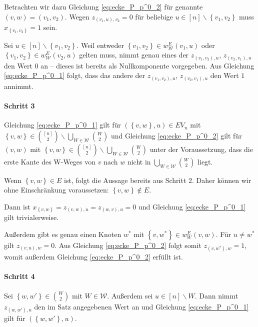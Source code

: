 \documentclass[10p,a4paper,BCOR = 12mm, DIV=15]{scrbook}
\begin{document}
\begin{bew}
Betrachten wir dazu Gleichung \eqref{eq:ecke_P_p^0_2} für genannte $\left(v, w\right) = \left(v_1, v_2\right)$. Wegen $z_{\left(v_1, u\right), v_2} = 0$ für beliebige $u \in \left[n\right] \backslash \left\{v_1, v_2\right\}$ muss $x_{\left\{v_1, v_2\right\}} = 1$ sein.

Sei $u \in \left[n\right] \backslash \left\{v_1, v_2\right\}$. Weil entweder $\left\{v_1, v_2\right\} \in w_{\mathcal{W}}^E\left(v_1, u\right)$ oder $\left\{v_1, v_2\right\} \in w_{\mathcal{W}}^E\left(v_2, u\right)$ gelten muss, nimmt genau eines der  $z_{\left(v_1, v_2\right), u}$, $z_{\left(v_2, v_1\right), u}$ den Wert 0 an -- dieses ist bereits als Nullkomponente vorgegeben. Aus Gleichung \eqref{eq:ecke_P_p^0_1} folgt, dass das andere der $z_{\left(v_1, v_2\right), u}$, $z_{\left(v_2, v_1\right), u}$ den Wert $1$ annimmt.

\paragraph{Schritt 3} Gleichung \eqref{eq:ecke_P_p^0_1} gilt für $\left(\left\{v, w\right\}, u\right)\in EV_n$ mit $\left\{v, w\right\} \in {\left[n\right] \choose 2} \backslash \bigcup_{W \in \mathcal{W}} {W \choose 2}$ und Gleichung \eqref{eq:ecke_P_p^0_2} gilt für $\left(v, w\right)$ mit $\left\{v, w\right\} \in {\left[n\right] \choose 2} \backslash \bigcup_{W \in \mathcal{W}} {W \choose 2}$ unter der Voraussetzung, dass die erste Kante des W-Weges von $v$ nach $w$ nicht in $\bigcup_{W \in \mathcal{W}} {W \choose 2}$ liegt.

Wenn $\left\{v, w\right\} \in E$ ist, folgt die Aussage bereits aus Schritt 2. Daher können wir ohne Einschränkung voraussetzen: $\left\{v, w\right\} \notin E$.

Dann ist $x_{\left\{v, w\right\}} = z_{\left(v, w\right), u} = z_{\left(w, v\right), u} = 0$ und Gleichung \eqref{eq:ecke_P_p^0_1} gilt trivialerweise.

Außerdem gibt es genau einen Knoten $w^*$ mit $\left\{v, w^*\right\} \in w_W^E\left(v, w\right)$. Für $u \neq w^*$ gilt $z_{\left(v, u\right), w} = 0$. Aus Gleichung \eqref{eq:ecke_P_p^0_2} folgt somit $z_{\left(v, w^*\right), w} = 1$, womit außerdem Gleichung \eqref{eq:ecke_P_p^0_2} erfüllt ist.

\paragraph{Schritt 4} Sei $\left\{w, w'\right\} \in {W \choose 2}$ mit $W \in \mathcal{W}$. Außerdem sei $u \in \left[n\right] \backslash W$. Dann nimmt $z_{\left(w, w'\right), u}$ den im Satz angegebenen Wert an und Gleichung \eqref{eq:ecke_P_p^0_1} gilt für $\left(\left\{w, w'\right\}, u\right)$.


\end{bew}
\end{document}
